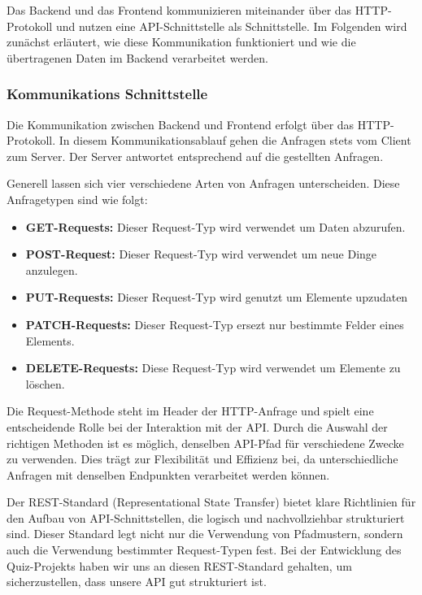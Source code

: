 Das Backend und das Frontend kommunizieren miteinander über das HTTP-Protokoll und nutzen 
eine API-Schnittstelle als Schnittstelle. Im Folgenden wird zunächst erläutert, wie diese 
Kommunikation funktioniert und wie die übertragenen Daten im Backend verarbeitet werden.

\subsubsection{Kommunikations Schnittstelle}

Die Kommunikation zwischen Backend und Frontend erfolgt über das HTTP-Protokoll. 
In diesem Kommunikationsablauf gehen die Anfragen stets vom Client zum Server. 
Der Server antwortet entsprechend auf die gestellten Anfragen.

Generell lassen sich vier verschiedene Arten von Anfragen unterscheiden. Diese Anfragetypen 
sind wie folgt:

\begin{itemize}
\item \textbf{GET-Requests:} Dieser Request-Typ wird verwendet um Daten abzurufen.
\item \textbf{POST-Request:} Dieser Request-Typ wird verwendet um neue Dinge anzulegen.
\item \textbf{PUT-Requests:} Dieser Request-Typ wird genutzt um Elemente upzudaten
\item \textbf{PATCH-Requests:} Dieser Request-Typ ersezt nur bestimmte Felder eines Elements.
\item \textbf{DELETE-Requests:} Diese Request-Typ wird verwendet um Elemente zu löschen.
\end{itemize}

\noindent Die Request-Methode steht im Header der HTTP-Anfrage und spielt eine entscheidende 
Rolle bei der Interaktion mit der API. Durch die Auswahl der richtigen Methoden ist es möglich, 
denselben API-Pfad für verschiedene Zwecke zu verwenden. Dies trägt zur Flexibilität und 
Effizienz bei, da unterschiedliche Anfragen mit denselben Endpunkten verarbeitet werden können.\newline

\noindent Der REST-Standard (Representational State Transfer) bietet klare Richtlinien für den 
Aufbau von API-Schnittstellen, die logisch und nachvollziehbar strukturiert sind. Dieser Standard 
legt nicht nur die Verwendung von Pfadmustern, sondern auch die Verwendung bestimmter 
Request-Typen fest. Bei der Entwicklung des Quiz-Projekts haben wir uns an diesen REST-Standard 
gehalten, um sicherzustellen, dass unsere API gut strukturiert ist. \newline

